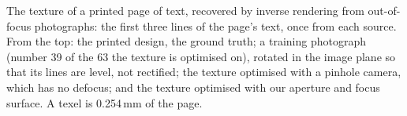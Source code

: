 The texture of a printed page of text, recovered by inverse rendering from out-of-focus photographs: the first three lines of the page's text, once from each source. From the top: the printed design, the ground truth; a training photograph (number 39 of the 63 the texture is optimised on), rotated in the image plane so that its lines are level, not rectified; the texture optimised with a pinhole camera, which has no defocus; and the texture optimised with our aperture and focus surface. A texel is 0.254\,mm of the page.
